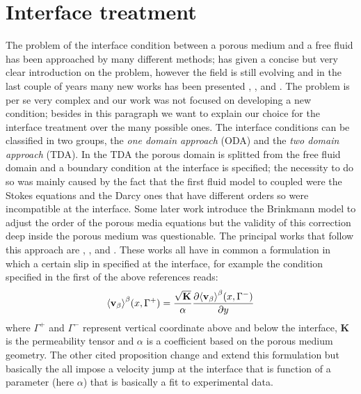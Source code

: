 \section{Interface treatment}
\label{ch:interface}

The problem of the interface condition between a porous medium and a free fluid has been approached by many different methods; \citet{ehrhardt2010interface} has given a concise but very clear introduction on the problem, however the field is still evolving and in the last couple of years many new works has been presented \citet{minale2014momentum}, \citet{angot2017asymptotic}, \citet{lacis2017framework} and .
The problem is per se very complex and our work was not focused on developing a new condition; besides in this paragraph we want to explain our choice for the interface treatment over the many possible ones.
The interface conditions can be classified in two groups, the \textit{one domain approach} (ODA) and the \textit{two domain approach} (TDA).
In the TDA the porous domain is splitted from the free fluid domain and a boundary condition at the interface is specified; the necessity to do so was mainly caused by the fact that the first fluid model to coupled were the Stokes equations and the Darcy ones that have different orders so were incompatible at the interface.
Some later work introduce the Brinkmann model to adjust the order of the porous media equations but the validity of this correction deep inside the porous medium was questionable.
The principal works that follow this approach are \citet{beavers1967boundary}, \citet{mikelic2000interface}, \citet{ochoa1995momentum} and \citet{le2006interfacial}.
These works all have in common a formulation in which a certain slip in specified at the interface, for example the condition specified in the first of the above references reads:
$$
{\left< \textbf{v}_{\beta} \right>}^{\beta}(x,\Gamma^+) = \dfrac{\sqrt{\mathbf{K}}}{\alpha} \dfrac{\partial {\left< \textbf{v}_{\beta}\right>}^{\beta}(x, \Gamma^-)}{\partial y}
$$
where $\Gamma^+$ and $\Gamma^-$ represent vertical coordinate above and below the interface, $\mathbf{K}$ is the permeability tensor and $\alpha$ is a coefficient based on the porous medium geometry.
The other cited proposition change and extend this formulation but basically the all impose a velocity jump at the interface that is function of a parameter (here $\alpha$) that is basically a fit to experimental data.

